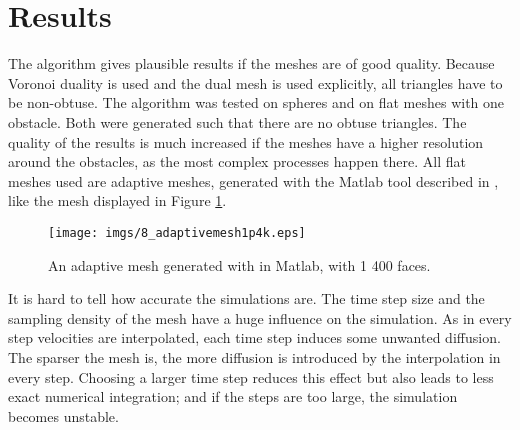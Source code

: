 


\section{Results}

The algorithm gives plausible results if the meshes are of good quality. Because Voronoi duality is used and the dual mesh is used explicitly, all triangles have to be non-obtuse. The algorithm was tested on spheres and on flat meshes with one obstacle. Both  were generated such that there are no obtuse triangles. The quality of the results is much increased if the meshes have a higher resolution around the obstacles, as the most complex processes happen there. All flat meshes used are adaptive meshes, generated with the Matlab tool described in \cite{meshmatlab}, like the mesh displayed in Figure \ref{fig:fd_meshes}.


\begin{figure}%
\begin{center}
\texttt{[image: imgs/8\_adaptivemesh1p4k.eps]}%
\end{center}
\caption{An adaptive mesh generated with \cite{meshmatlab} in Matlab, with 1 400 faces.}%
\label{fig:fd_meshes}%
\end{figure}

It is hard to tell how accurate the simulations are. The time step size and the sampling density of the mesh have a huge influence on the simulation. As in every step velocities are interpolated, each time step induces some unwanted diffusion. The sparser the mesh is, the more diffusion is introduced by the interpolation in every step. Choosing a larger time step reduces this effect but also leads to less exact numerical integration; and if the steps are too large, the simulation becomes unstable. 

